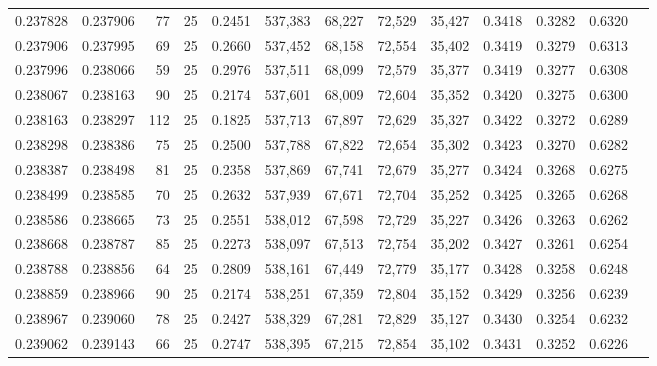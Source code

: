 \begin{tabular}{rrrrrrrrrrrrr}
0.237828 & 0.237906 &    77 &  25 &                                     0.2451 & 537,383 &  68,227 &  72,529 &  35,427 & 0.3418 & 0.3282 & 0.6320 \\
0.237906 & 0.237995 &    69 &  25 &                                     0.2660 & 537,452 &  68,158 &  72,554 &  35,402 & 0.3419 & 0.3279 & 0.6313 \\
0.237996 & 0.238066 &    59 &  25 &                                     0.2976 & 537,511 &  68,099 &  72,579 &  35,377 & 0.3419 & 0.3277 & 0.6308 \\
0.238067 & 0.238163 &    90 &  25 &                                     0.2174 & 537,601 &  68,009 &  72,604 &  35,352 & 0.3420 & 0.3275 & 0.6300 \\
0.238163 & 0.238297 &   112 &  25 &                                     0.1825 & 537,713 &  67,897 &  72,629 &  35,327 & 0.3422 & 0.3272 & 0.6289 \\
0.238298 & 0.238386 &    75 &  25 &                                     0.2500 & 537,788 &  67,822 &  72,654 &  35,302 & 0.3423 & 0.3270 & 0.6282 \\
0.238387 & 0.238498 &    81 &  25 &                                     0.2358 & 537,869 &  67,741 &  72,679 &  35,277 & 0.3424 & 0.3268 & 0.6275 \\
0.238499 & 0.238585 &    70 &  25 &                                     0.2632 & 537,939 &  67,671 &  72,704 &  35,252 & 0.3425 & 0.3265 & 0.6268 \\
0.238586 & 0.238665 &    73 &  25 &                                     0.2551 & 538,012 &  67,598 &  72,729 &  35,227 & 0.3426 & 0.3263 & 0.6262 \\
0.238668 & 0.238787 &    85 &  25 &                                     0.2273 & 538,097 &  67,513 &  72,754 &  35,202 & 0.3427 & 0.3261 & 0.6254 \\
0.238788 & 0.238856 &    64 &  25 &                                     0.2809 & 538,161 &  67,449 &  72,779 &  35,177 & 0.3428 & 0.3258 & 0.6248 \\
0.238859 & 0.238966 &    90 &  25 &                                     0.2174 & 538,251 &  67,359 &  72,804 &  35,152 & 0.3429 & 0.3256 & 0.6239 \\
0.238967 & 0.239060 &    78 &  25 &                                     0.2427 & 538,329 &  67,281 &  72,829 &  35,127 & 0.3430 & 0.3254 & 0.6232 \\
0.239062 & 0.239143 &    66 &  25 &                                     0.2747 & 538,395 &  67,215 &  72,854 &  35,102 & 0.3431 & 0.3252 & 0.6226 \\

\end{tabular}
